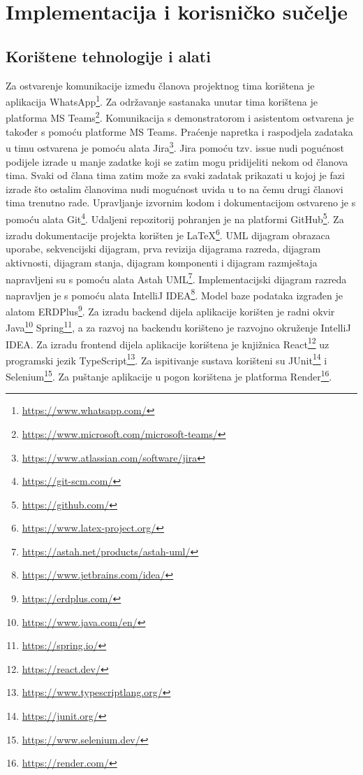 \chapter{Implementacija i korisničko sučelje}
		
		
		\section{Korištene tehnologije i alati}
		
			
			 
			 Za ostvarenje komunikacije između članova projektnog tima korištena je aplikacija WhatsApp\footnote{\url{https://www.whatsapp.com/}}. Za održavanje sastanaka unutar tima korištena je platforma MS Teams\footnote{\url{https://www.microsoft.com/microsoft-teams/}}. Komunikacija s demonstratorom i asistentom ostvarena je također s pomoću platforme MS Teams. Praćenje napretka i raspodjela zadataka u timu ostvarena je pomoću alata Jira\footnote{\url{https://www.atlassian.com/software/jira}}. Jira pomoću tzv. issue nudi pogućnost podijele izrade u manje zadatke koji se zatim mogu pridijeliti nekom od članova tima. Svaki od člana tima zatim može za svaki zadatak prikazati u kojoj je fazi izrade što ostalim članovima nudi mogućnost uvida u to na čemu drugi članovi tima trenutno rade. Upravljanje izvornim kodom i dokumentacijom ostvareno je s pomoću alata Git\footnote{\url{https://git-scm.com/}}. Udaljeni repozitorij pohranjen je na platformi GitHub\footnote{\url{https://github.com/}}. Za izradu dokumentacije projekta korišten je LaTeX\footnote{\url{https://www.latex-project.org/}}. UML dijagram obrazaca uporabe, sekvencijski dijagram, prva revizija dijagrama razreda, dijagram aktivnosti, dijagram stanja, dijagram komponenti i dijagram razmještaja napravljeni su s pomoću alata Astah UML\footnote{\url{https://astah.net/products/astah-uml/}}. Implementacijski dijagram razreda napravljen je s pomoću alata IntelliJ IDEA\footnote{\url{https://www.jetbrains.com/idea/}}. Model baze podataka izgrađen je alatom ERDPlus\footnote{\url{https://erdplus.com/}}. Za izradu backend dijela aplikacije korišten je radni okvir Java\footnote{\url{https://www.java.com/en/}} Spring\footnote{\url{https://spring.io/}}, a za razvoj na backendu korišteno je razvojno okruženje IntelliJ IDEA. Za izradu frontend dijela aplikacije korištena je knjižnica React\footnote{\url{https://react.dev/}} uz programski jezik TypeScript\footnote{\url{https://www.typescriptlang.org/}}. Za ispitivanje sustava korišteni su JUnit\footnote{\url{https://junit.org/}} i Selenium\footnote{\url{https://www.selenium.dev/}}. Za puštanje aplikacije u pogon korištena je platforma Render\footnote{\url{https://render.com/}}.
			
